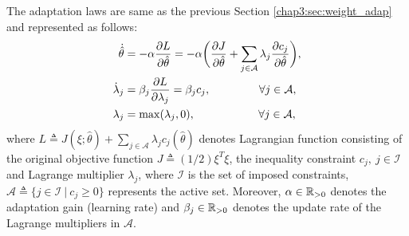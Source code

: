 The adaptation laws are same as the previous Section \ref{chap3:sec:weight_adap} and represented as follows:
\begin{subequations}
    \begin{align}
        \dot {\hat\theta}&=-\alpha {\partial L\over\partial \hat\theta}
        =-\alpha 
        \bigg(
        {\partial J\over \partial \hat\theta}+\sum_{j\in\mathcal{A}}
        \lambda_j {\partial c_j\over\partial \hat\theta}
        \bigg),
    \label{chap4:eq:adap_th}
        \\
        \dot\lambda_j& = \beta_j{\partial L\over\partial \lambda_j} = \beta_j c_j ,
        \quad\quad\quad\quad      \      
        \forall j\in\mathcal A,
    \label{chap4:eq:adap_L}
        \\
        \lambda_j & = \max(\lambda_j,0) ,
        \quad\quad\quad\quad\ \ \ \ \ 
        \forall j\in\mathcal A,
    \label{chap4:eq:adap_L_max}
    \end{align}
    \label{chap4:eq:adap}
\end{subequations}
where $L\triangleq J(\xi;\hat\theta)+\sum_{j\in\mathcal A}\lambda_j c_j(\hat\theta)$ denotes Lagrangian function consisting of the original objective function $J\triangleq(1/2)\xi^T\xi$, the inequality constraint $c_j,\ j\in\mathcal I$ and Lagrange multiplier $\lambda_j$, where $\mathcal I$ is the set of imposed constraints, $\mathcal A \triangleq \{j\in\mathcal I\ |\ c_j\ge 0\}$ represents the active set.
Moreover, $\alpha\in\mathbb{R}_{>0}$ denotes the adaptation gain (learning rate) and $\beta_j\in\mathbb{R}_{>0}$ denotes the update rate of the Lagrange multipliers in $\mathcal A$. 


